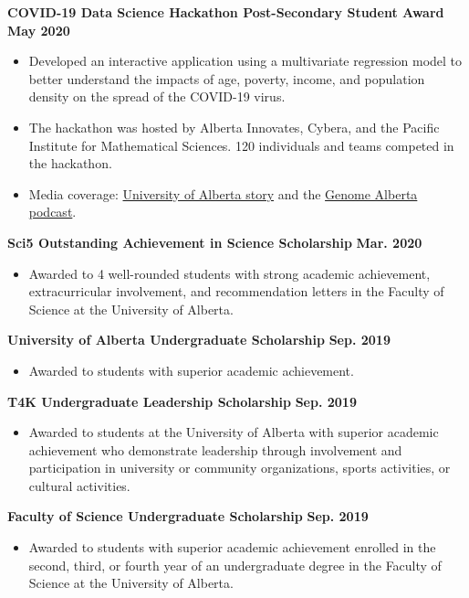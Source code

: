 \documentclass{article}
\begin{document}
\textbf{COVID-19 Data Science Hackathon Post-Secondary Student Award} \hfill \textbf{May 2020}
\begin{itemize}
    \item Developed an interactive application using a multivariate regression model to better understand the impacts of age, poverty, income, and population density on the spread of the COVID-19 virus.
    \item The hackathon was hosted by Alberta Innovates, Cybera, and the Pacific Institute for Mathematical Sciences. 120 individuals and teams competed in the hackathon.
    \item Media coverage: \href{https://www.folio.ca/students-develop-online-tool-to-predict-covid-19-spread-based-on-demographics/}{University of Alberta story} and the \href{https://genomealberta.ca/genomics/genomics_blog_08182001.aspx}{Genome Alberta podcast}.
\end{itemize}

\textbf{Sci5 Outstanding Achievement in Science Scholarship} \hfill \textbf{Mar. 2020}
\begin{itemize}
    \item Awarded to 4 well-rounded students with strong academic achievement, extracurricular involvement, and recommendation letters in the Faculty of Science at the University of Alberta.
\end{itemize}

\textbf{University of Alberta Undergraduate Scholarship} \hfill \textbf{Sep. 2019}
    \begin{itemize}
        \item Awarded to students with superior academic achievement.
    \end{itemize}

\textbf{T4K Undergraduate Leadership Scholarship} \hfill \textbf{Sep. 2019}
    \begin{itemize}
        \item Awarded to students at the University of Alberta with superior academic achievement who demonstrate leadership through involvement and participation in university or community organizations, sports activities, or cultural activities.
    \end{itemize}

\textbf{Faculty of Science Undergraduate Scholarship} \hfill \textbf{Sep. 2019}
    \begin{itemize}
        \item Awarded to students with superior academic achievement enrolled in the second, third, or fourth year of an undergraduate degree in the Faculty of Science at the University of Alberta.
    \end{itemize}
\end{document}
